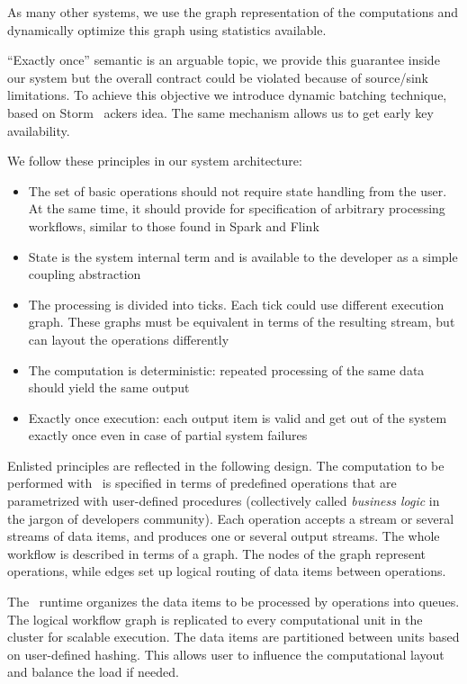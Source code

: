 As many other systems, we use the graph representation of the computations and dynamically optimize this graph using statistics available. 

``Exactly once'' semantic is an arguable topic, we provide this guarantee inside our system but the overall contract could be violated because of source/sink limitations. To achieve this objective we introduce dynamic batching technique, based on Storm~\cite{apache:storm} ackers idea. The same mechanism allows us to get early key availability.

We follow these principles in our system architecture:
\begin{itemize}
\item The set of basic operations should not require state handling from the user. At the same time, it should provide for specification of arbitrary processing workflows, similar to those found in Spark and Flink
\item State is the system internal term and is available to the developer as a simple coupling abstraction
\item The processing is divided into ticks. Each tick could use different execution graph. These graphs must be equivalent in terms of the resulting stream, but can layout the operations differently
\item The computation is deterministic: repeated processing of the same data should yield the same output
\item Exactly once execution: each output item is valid and get out of the system exactly once even in case of partial system failures
\end{itemize}

Enlisted principles are reflected in the following design. The computation to be performed with \FlameStream\ is specified in terms of predefined operations that are parametrized with user-defined procedures (collectively called {\em business logic} in the jargon of developers community). Each operation accepts a stream or several streams of data items, and produces one or several output streams. The whole workflow is described in terms of a graph. The nodes of the graph represent operations, while edges set up logical routing of data items between operations.

The \FlameStream\ runtime organizes the data items to be processed by operations into queues. The logical workflow graph is replicated to every computational unit in the cluster for scalable execution. The data items are partitioned between units based on user-defined hashing. This allows user to influence the computational layout and balance the load if needed.

